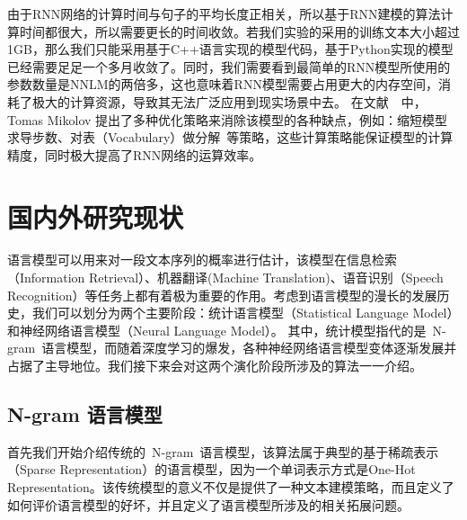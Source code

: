由于RNN网络的计算时间与句子的平均长度正相关，所以基于RNN建模的算法计算时间都很大，所以需要更长的时间收敛。若我们实验的采用的训练文本大小超过1GB，那么我们只能采用基于C++语言实现的模型代码，基于Python实现的模型已经需要足足一个多月收敛了。同时，我们需要看到最简单的RNN模型所使用的参数数量是NNLM的两倍多，这也意味着RNN模型需要占用更大的内存空间，消耗了极大的计算资源，导致其无法广泛应用到现实场景中去。
在文献~\cite{DBLP:conf/icassp/MikolovKBCK11}~中，Tomas Mikolov 提出了多种优化策略来消除该模型的各种缺点，例如：缩短模型求导步数、对表（Vocabulary）做分解~\cite{DBLP:journals/coling/BrownPdLM92}等策略，这些计算策略能保证模型的计算精度，同时极大提高了RNN网络的运算效率。

\section{国内外研究现状}
语言模型可以用来对一段文本序列的概率进行估计，该模型在信息检索（Information Retrieval）、机器翻译(Machine Translation)、语音识别（Speech Recognition）等任务上都有着极为重要的作用。考虑到语言模型的漫长的发展历史，我们可以划分为两个主要阶段：统计语言模型（Statistical Language Model）和神经网络语言模型（Neural Language Model）。
其中，统计模型指代的是~N-gram~语言模型，而随着深度学习的爆发，各种神经网络语言模型变体逐渐发展并占据了主导地位。我们接下来会对这两个演化阶段所涉及的算法一一介绍。

\subsection{N-gram 语言模型}
首先我们开始介绍传统的~N-gram~语言模型，该算法属于典型的基于稀疏表示（Sparse Representation）的语言模型，因为一个单词表示方式是One-Hot Representation。该传统模型的意义不仅是提供了一种文本建模策略，而且定义了如何评价语言模型的好坏，并且定义了语言模型所涉及的相关拓展问题。

